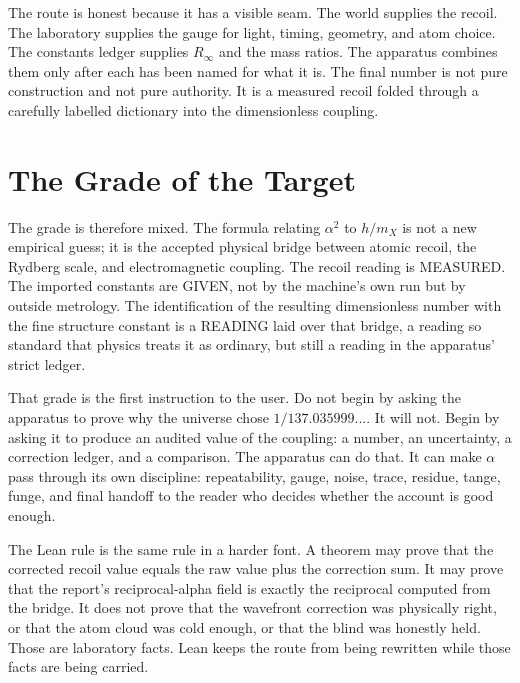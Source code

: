 The route is honest because it has a visible seam. The world supplies the recoil. The laboratory supplies the
gauge for light, timing, geometry, and atom choice. The constants ledger supplies \(R_\infty\) and the mass
ratios. The apparatus combines them only after each has been named for what it is. The final number is not pure
construction and not pure authority. It is a measured recoil folded through a carefully labelled dictionary into
the dimensionless coupling.

\section{The Grade of the Target}

The grade is therefore mixed. The formula relating \(\alpha^2\) to \(h/m_X\) is not a new empirical guess; it is
the accepted physical bridge between atomic recoil, the Rydberg scale, and electromagnetic coupling. The recoil
reading is MEASURED. The imported constants are GIVEN, not by the machine's own run but by outside metrology. The
identification of the resulting dimensionless number with the fine structure constant is a READING laid over
that bridge, a reading so standard that physics treats it as ordinary, but still a reading in the apparatus'
strict ledger.

That grade is the first instruction to the user. Do not begin by asking the apparatus to prove why the universe
chose \(1/137.035999...\). It will not. Begin by asking it to produce an audited value of the coupling: a number,
an uncertainty, a correction ledger, and a comparison. The apparatus can do that. It can make \(\alpha\) pass
through its own discipline: repeatability, gauge, noise, trace, residue, tange, funge, and final handoff to the
reader who decides whether the account is good enough.

The Lean rule is the same rule in a harder font. A theorem may prove that the corrected recoil value equals the
raw value plus the correction sum. It may prove that the report's reciprocal-alpha field is exactly the reciprocal
computed from the bridge. It does not prove that the wavefront correction was physically right, or that the atom
cloud was cold enough, or that the blind was honestly held. Those are laboratory facts. Lean keeps the route from
being rewritten while those facts are being carried.
